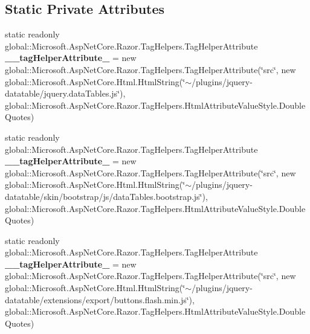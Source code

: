 \subsection*{Static Private Attributes}
\begin{DoxyCompactItemize}
\item 
\mbox{\label{class_asp_net_core_1_1_views___movements___index_a8f392d94c1d2907ec46739bd765df9dc}} 
static readonly global\+::\+Microsoft.\+Asp\+Net\+Core.\+Razor.\+Tag\+Helpers.\+Tag\+Helper\+Attribute {\bfseries \+\_\+\+\_\+tag\+Helper\+Attribute\+\_} = new global\+::\+Microsoft.\+Asp\+Net\+Core.\+Razor.\+Tag\+Helpers.\+Tag\+Helper\+Attribute(\char`\"{}src\char`\"{}, new global\+::\+Microsoft.\+Asp\+Net\+Core.\+Html.\+Html\+String(\char`\"{}$\sim$/plugins/jquery-\/datatable/jquery.\+data\+Tables.\+js\char`\"{}), global\+::\+Microsoft.\+Asp\+Net\+Core.\+Razor.\+Tag\+Helpers.\+Html\+Attribute\+Value\+Style.\+Double\+Quotes)
\item 
\mbox{\label{class_asp_net_core_1_1_views___movements___index_ad5bcd7f1c31121a693b2f765bda45206}} 
static readonly global\+::\+Microsoft.\+Asp\+Net\+Core.\+Razor.\+Tag\+Helpers.\+Tag\+Helper\+Attribute {\bfseries \+\_\+\+\_\+tag\+Helper\+Attribute\+\_} = new global\+::\+Microsoft.\+Asp\+Net\+Core.\+Razor.\+Tag\+Helpers.\+Tag\+Helper\+Attribute(\char`\"{}src\char`\"{}, new global\+::\+Microsoft.\+Asp\+Net\+Core.\+Html.\+Html\+String(\char`\"{}$\sim$/plugins/jquery-\/datatable/skin/bootstrap/js/data\+Tables.\+bootstrap.\+js\char`\"{}), global\+::\+Microsoft.\+Asp\+Net\+Core.\+Razor.\+Tag\+Helpers.\+Html\+Attribute\+Value\+Style.\+Double\+Quotes)
\item 
\mbox{\label{class_asp_net_core_1_1_views___movements___index_a97f610795a5f1dc2c6cf6ded02720af3}} 
static readonly global\+::\+Microsoft.\+Asp\+Net\+Core.\+Razor.\+Tag\+Helpers.\+Tag\+Helper\+Attribute {\bfseries \+\_\+\+\_\+tag\+Helper\+Attribute\+\_} = new global\+::\+Microsoft.\+Asp\+Net\+Core.\+Razor.\+Tag\+Helpers.\+Tag\+Helper\+Attribute(\char`\"{}src\char`\"{}, new global\+::\+Microsoft.\+Asp\+Net\+Core.\+Html.\+Html\+String(\char`\"{}$\sim$/plugins/jquery-\/datatable/extensions/export/buttons.\+flash.\+min.\+js\char`\"{}), global\+::\+Microsoft.\+Asp\+Net\+Core.\+Razor.\+Tag\+Helpers.\+Html\+Attribute\+Value\+Style.\+Double\+Quotes)

\end{DoxyCompactItemize}
